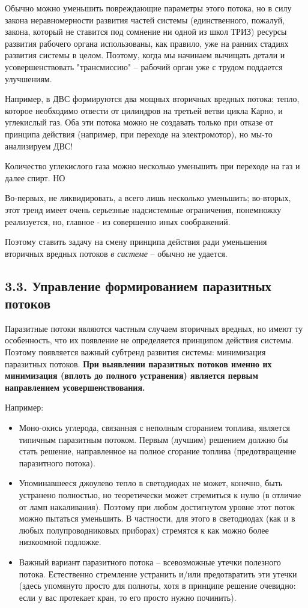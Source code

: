 \documentclass[a4paper,11pt]{article}
\begin{document}
Обычно можно уменьшить повреждающие параметры этого потока, но в силу закона
неравномерности развития частей системы (единственного, пожалуй, закона,
который не ставится под сомнение ни одной из школ ТРИЗ) ресурсы развития
рабочего органа использованы, как правило, уже на ранних стадиях развития
системы в целом. Поэтому, когда мы начинаем вычищать детали и
усовершенствовать "трансмиссию" {--} рабочий орган уже с трудом поддается
улучшениям.

Например, в ДВС формируются два мощных вторичных вредных потока: тепло,
которое необходимо отвести от цилиндров на третьей ветви цикла Карно, и
углекислый газ. Оба эти потока можно не создавать только при отказе от
принципа действия (например, при переходе на электромотор), но мы-то
анализируем ДВС!

Количество углекислого газа можно несколько уменьшить при переходе на газ и
далее спирт. НО

Во-первых, не ликвидировать, а всего лишь несколько уменьшить; во-вторых, этот
тренд имеет очень серьезные надсистемные ограничения, понемножку реализуется,
но, главное - из совершенно иных соображений.

Поэтому ставить задачу на смену принципа действия ради уменьшения вторичных
вредных потоков \emph{в системе} -- обычно не удается.

\subsection{3.3. Управление формированием паразитных потоков}

Паразитные потоки являются частным случаем вторичных вредных, но имеют ту
особенность, что их появление не определяется принципом действия системы.
Поэтому появляется важный субтренд развития системы: минимизация паразитных
потоков. \textbf{При выявлении паразитных потоков именно их минимизация
  (вплоть до полного устранения) является первым направлением
  усовершенствования.}

Например:
\begin{itemize}
\item Моно-окись углерода, связанная с неполным сгоранием топлива, является
  типичным паразитным потоком. Первым (лучшим) решением должно бы стать
  решение, направленное на полное сгорание топлива (предотвращение паразитного
  потока).
\item Упоминавшееся джоулево тепло в светодиодах не может, конечно, быть
  устранено полностью, но теоретически может стремиться к нулю (в отличие от
  ламп накаливания). Поэтому при любом достигнутом уровне этот поток можно
  пытаться уменьшить. В частности, для этого в светодиодах (как и в любых
  полупроводниковых приборах) стремятся к как можно более низкоомной подложке.
\item Важный вариант паразитного потока -- всевозможные утечки полезного
  потока. Естественно стремление устранить и/или предотвратить эти утечки
  (здесь упомянуто просто для полноты, хотя в принципе решение очевидно: если
  у вас протекает кран, то его просто нужно починить).
\end{itemize}
\end{document}
